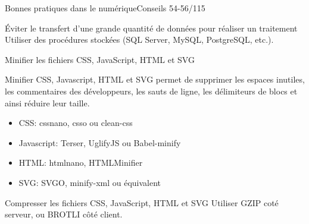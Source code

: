 \begin{frame}{Bonnes pratiques dans le numérique}{Conseils 54-56/115}
\begin{block}{Éviter le transfert d'une grande quantité de données pour réaliser un traitement}
Utiliser des  procédures stockées (SQL Server, MySQL, PostgreSQL, etc.).
\end{block}

\begin{block}{Minifier les fichiers CSS, JavaScript, HTML et SVG}

Minifier CSS, Javascript, HTML et SVG permet de supprimer les espaces inutiles, les commentaires des développeurs, les sauts de ligne, les délimiteurs de blocs et ainsi réduire leur taille.

\begin{itemize}
    \item CSS: cssnano, csso ou clean-css
    \item Javascript: Terser, UglifyJS ou Babel-minify
    \item HTML: htmlnano, HTMLMinifier
    \item SVG: SVGO, minify-xml ou équivalent
\end{itemize}

\end{block}

\begin{block}{Compresser les fichiers CSS, JavaScript, HTML et SVG}
Utiliser GZIP coté serveur, ou BROTLI côté client.
\end{block}
\end{frame}

